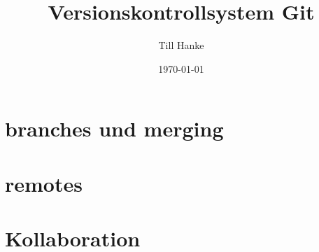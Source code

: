 \documentclass[a4paper]{article}
\title{Versionskontrollsystem Git}\let\Title\@title
\author{Till Hanke}          \let\Author\@author
\date{\today}           \let\Date\@date
\begin{document}

\newpage
\tableofcontents
\newpage


\newpage

%
\newpage

%
\section{branches und merging }
%
\section{remotes}
%
\section{Kollaboration}
%
\newpage
\nocite{*}


\end{document}
